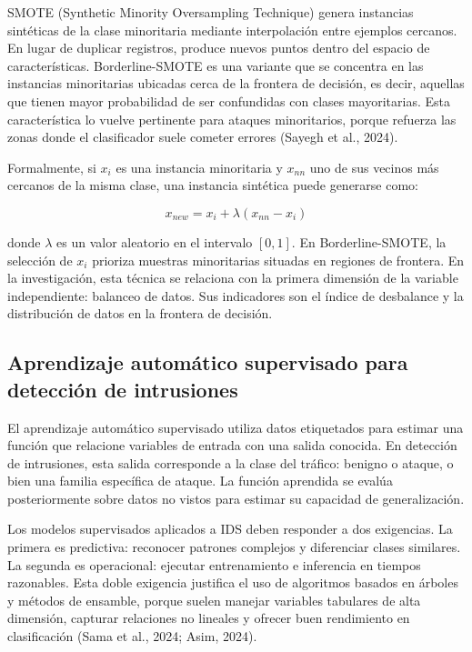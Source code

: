 \documentclass[12pt,a4paper]{article}
\begin{document}
SMOTE (Synthetic Minority Oversampling Technique) genera instancias sintéticas de la clase minoritaria mediante interpolación entre ejemplos cercanos. En lugar de duplicar registros, produce nuevos puntos dentro del espacio de características. Borderline-SMOTE es una variante que se concentra en las instancias minoritarias ubicadas cerca de la frontera de decisión, es decir, aquellas que tienen mayor probabilidad de ser confundidas con clases mayoritarias. Esta característica lo vuelve pertinente para ataques minoritarios, porque refuerza las zonas donde el clasificador suele cometer errores (Sayegh et al., 2024).

Formalmente, si $x_i$ es una instancia minoritaria y $x_{nn}$ uno de sus vecinos más cercanos de la misma clase, una instancia sintética puede generarse como:

\[
x_{new} = x_i + \lambda (x_{nn} - x_i)
\]

donde $\lambda$ es un valor aleatorio en el intervalo $[0,1]$. En Borderline-SMOTE, la selección de $x_i$ prioriza muestras minoritarias situadas en regiones de frontera. En la investigación, esta técnica se relaciona con la primera dimensión de la variable independiente: balanceo de datos. Sus indicadores son el índice de desbalance y la distribución de datos en la frontera de decisión.

\subsection{Aprendizaje automático supervisado para detección de intrusiones}

El aprendizaje automático supervisado utiliza datos etiquetados para estimar una función que relacione variables de entrada con una salida conocida. En detección de intrusiones, esta salida corresponde a la clase del tráfico: benigno o ataque, o bien una familia específica de ataque. La función aprendida se evalúa posteriormente sobre datos no vistos para estimar su capacidad de generalización.

Los modelos supervisados aplicados a IDS deben responder a dos exigencias. La primera es predictiva: reconocer patrones complejos y diferenciar clases similares. La segunda es operacional: ejecutar entrenamiento e inferencia en tiempos razonables. Esta doble exigencia justifica el uso de algoritmos basados en árboles y métodos de ensamble, porque suelen manejar variables tabulares de alta dimensión, capturar relaciones no lineales y ofrecer buen rendimiento en clasificación (Sama et al., 2024; Asim, 2024).
\end{document}
